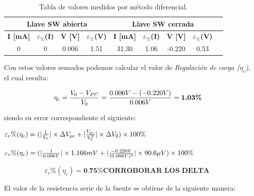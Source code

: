\documentclass{article}
\begin{document}
\begin{table}[!hbt]
	\begin{center}

		\begin{tabular}{|c|c|c|c|c|c|c|c|c|} \hline
			\multicolumn{4}{|c|}{\textbf{Llave SW abierta}} & \multicolumn{4}{c|}{\textbf{Llave SW cerrada}} \\ \hline
			\textbf{I [mA]} & \textbf{$\varepsilon_{\%}$(I)} & \textbf{V [V]} & \textbf{$\varepsilon_{\%}$(V)} & \textbf{I [mA]} & \textbf{$\varepsilon_{\%}$(I)} & \textbf{V [V]} & \textbf{$\varepsilon_{\%}$(V)} \\\cline{1-8}
			0 & 0 & 0.006 & 1.51 & 31.30 & 1.06 & -0.220 & 0.53 \\\cline{1-8}
		\end{tabular}

	\caption{Tabla de valores medidos por método diferencial.}
	\end{center}
\end{table}
\bigskip



Con estos valores sensados podemos calcular el valor de \textit{Regulación de carga ($\eta_c$)}, el cual resulta:
\bigskip

\begin{equation}
 	\eta_c = {V_0 - V_{PC} \over V_0} = {0.006V - (-0.220V) \over 0.006V} = \textbf{1.03\%}
\end{equation}
\bigskip


\noindent siendo su error correspondiente el siguiente:
\bigskip

\begin{center}
	$\varepsilon_r\%(\eta_c) = (|{1 \over V_{0}}| \times \Delta V_{pc} + |{V_{pc} \over V_{0}^2}| \times \Delta V_{0})\times 100\% $ \\
\end{center}

\begin{center}
	$\varepsilon_r\%(\eta_c) = (|{1 \over 0.006V}| \times 1.166mV + |{-0.220V \over (0.006V)^2}| \times 90.6\mu V)\times 100\%$ \\
\end{center}

\begin{equation}
	\varepsilon_r\%(\eta_c) = \textbf{0.75\% CORROBORAR LOS DELTA }
\end{equation}

\bigskip\bigskip


\noindent El valor de la resistencia serie de la fuente se obtiene de la siguiente manera:
\bigskip
\end{document}
